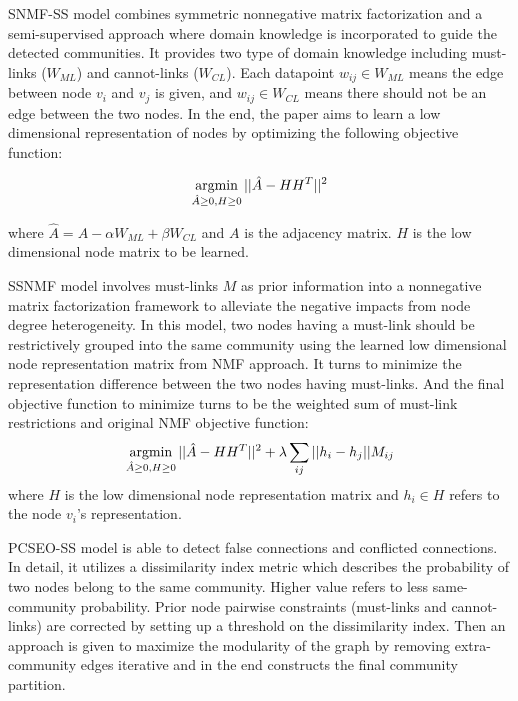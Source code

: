 SNMF-SS model \cite{ma2010semi} combines symmetric nonnegative matrix factorization and a semi-supervised approach where domain knowledge is incorporated to guide the detected communities. It provides two type of domain knowledge including must-links ($W_{ML}$) and cannot-links ($W_{CL}$). Each datapoint $w_{ij} \in W_{ML}$ means the edge between node $v_i$ and $v_j$ is given, and $w_{ij} \in W_{CL}$ means there should not be an edge between the two nodes. In the end, the paper aims to learn a low dimensional representation of nodes by optimizing the following objective function:

\begin{equation}
\operatorname*{argmin}_{\hat{A} \geq 0, H \geq 0} || \hat{A} - HH^{T} ||^2
\end{equation}

where $\hat{A} = A - \alpha W_{ML} + \beta W_{CL}$ and $A$ is the adjacency matrix. $H$ is the low dimensional node matrix to be learned. 
 
SSNMF model \cite{liu2017semi} involves must-links $M$ as prior information into a nonnegative matrix factorization framework to alleviate the negative impacts from node degree heterogeneity.  In this model, two nodes having a must-link should be restrictively grouped into the same community using the learned low dimensional node representation matrix from NMF approach. It turns to minimize the representation difference between the two nodes having must-links. And the final objective function to minimize turns to be the weighted sum of must-link restrictions and original NMF objective function:
\begin{equation}
  \operatorname*{argmin}_{\hat{A} \geq 0, H \geq 0} || \hat{A} - HH^{T} ||^2 + \lambda \sum_{ij}||h_i - h_j|| M_{ij}
\end{equation}
where $H$ is the low dimensional node representation matrix and $h_{i} \in H$ refers to the node $v_{i}$'s representation. 

PCSEO-SS model \cite{li2014extremal} is able to detect false connections and conflicted connections. In detail, it utilizes a dissimilarity index metric which describes the probability of two nodes belong to the same community. Higher value refers to less same-community probability. Prior node pairwise constraints (must-links and cannot-links) are corrected by setting up a threshold on the dissimilarity index.  Then an approach is given to maximize the modularity of the graph by removing extra-community edges iterative and in the end constructs the final community partition. 

